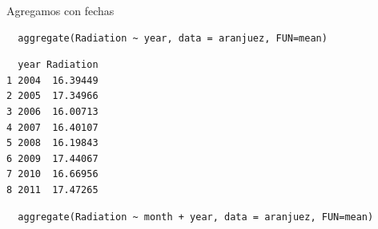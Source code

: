 \documentclass[xcolor={usenames,svgnames,dvipsnames}]{beamer}
\begin{document}
\begin{frame}[fragile,label=sec-5-2-4]{Agregamos con fechas}
 \lstset{language=R,label= ,caption= ,numbers=none}
\begin{lstlisting}
  aggregate(Radiation ~ year, data = aranjuez, FUN=mean)
\end{lstlisting}

\begin{verbatim}
  year Radiation
1 2004  16.39449
2 2005  17.34966
3 2006  16.00713
4 2007  16.40107
5 2008  16.19843
6 2009  17.44067
7 2010  16.66956
8 2011  17.47265
\end{verbatim}

\lstset{language=R,label= ,caption= ,numbers=none}
\begin{lstlisting}
  aggregate(Radiation ~ month + year, data = aranjuez, FUN=mean)
\end{lstlisting}


\end{frame}
\end{document}
